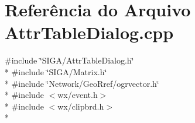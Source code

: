 \section{Referência do Arquivo Attr\+Table\+Dialog.\+cpp}
\label{_attr_table_dialog_8cpp}
{\ttfamily \#include \char`\"{}S\+I\+G\+A/\+Attr\+Table\+Dialog.\+h\char`\"{}}\\*
{\ttfamily \#include \char`\"{}S\+I\+G\+A/\+Matrix.\+h\char`\"{}}\\*
{\ttfamily \#include \char`\"{}Network/\+Geo\+Rref/ogrvector.\+h\char`\"{}}\\*
{\ttfamily \#include $<$wx/event.\+h$>$}\\*
{\ttfamily \#include $<$wx/clipbrd.\+h$>$}\\*
